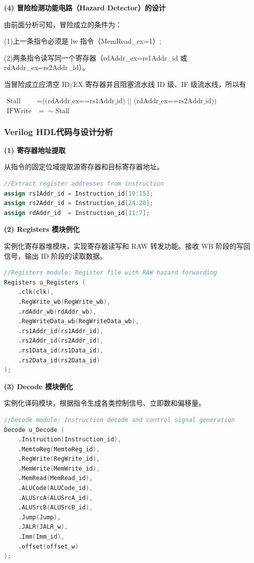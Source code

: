 \documentclass[12pt,a4paper]{article}
\begin{document}
\textbf{(4) 冒险检测功能电路（Hazard Detector）的设计}

由前面分析可知，冒险成立的条件为：

(1)上一条指令必须是 lw 指令（MemRead\_ex=1）;

(2)两条指令读写同一个寄存器（rdAddr\_ex=rs1Addr\_id 或 rdAddr\_ex=rs2Addr\_id）。

当冒险成立应清空 ID/EX 寄存器并且阻塞流水线 ID 级、IF 级流水线，所以有

\begin{align}
\text{Stall}&=\text{((rdAddr\_ex==rs1Addr\_id) || (rdAddr\_ex==rs2Addr\_id)) \&\&MemRead\_ex} \tag{6.3.6} \\
\text{IFWrite}&= \sim\text{Stall} \tag{6.3.7}
\end{align}

\subsubsection{Verilog HDL代码与设计分析}

\textbf{(1) 寄存器地址提取}

从指令的固定位域提取源寄存器和目标寄存器地址。

\begin{lstlisting}[language=verilog]
//Extract register addresses from instruction
assign rs1Addr_id = Instruction_id[19:15];
assign rs2Addr_id = Instruction_id[24:20];
assign rdAddr_id  = Instruction_id[11:7];
\end{lstlisting}

\textbf{(2) Registers 模块例化}

实例化寄存器堆模块，实现寄存器读写和 RAW 转发功能。接收 WB 阶段的写回信号，输出 ID 阶段的读取数据。

\begin{lstlisting}[language=verilog]
//Registers module: Register file with RAW hazard forwarding
Registers u_Registers (
    .clk(clk),
    .RegWrite_wb(RegWrite_wb),
    .rdAddr_wb(rdAddr_wb),
    .RegWriteData_wb(RegWriteData_wb),
    .rs1Addr_id(rs1Addr_id),
    .rs2Addr_id(rs2Addr_id),
    .rs1Data_id(rs1Data_id),
    .rs2Data_id(rs2Data_id)
);
\end{lstlisting}

\textbf{(3) Decode 模块例化}

实例化译码模块，根据指令生成各类控制信号、立即数和偏移量。

\begin{lstlisting}[language=verilog]
//Decode module: Instruction decode and control signal generation
Decode u_Decode (
    .Instruction(Instruction_id),
    .MemtoReg(MemtoReg_id),
    .RegWrite(RegWrite_id),
    .MemWrite(MemWrite_id),
    .MemRead(MemRead_id),
    .ALUCode(ALUCode_id),
    .ALUSrcA(ALUSrcA_id),
    .ALUSrcB(ALUSrcB_id),
    .Jump(Jump),
    .JALR(JALR_w),
    .Imm(Imm_id),
    .offset(offset_w)
);
\end{lstlisting}
\end{document}
